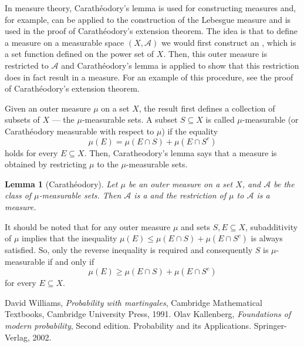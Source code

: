 \documentclass[12pt]{article}
\newtheorem*{lemma}{Lemma}
\begin{document}
In measure theory, Carath\'eodory's lemma is used for constructing measures and, for example, can be applied to the construction of the Lebesgue measure and is used in the proof of Carath\'eodory's extension theorem.
The idea is that to define a measure on a measurable space $(X,\mathcal{A})$ we would first construct an , which is a set function defined on the power set of $X$. Then, this outer measure is restricted to $\mathcal{A}$ and Carath\'eodory's lemma is applied to show that this restriction does in fact result in a measure. For an example of this procedure, see the proof of Carath\'eodory's extension theorem.

Given an outer measure $\mu$ on a set $X$, the result first defines a collection of subsets of $X$ --- the $\mu$-measurable sets.
A subset $S\subseteq X$ is called $\mu$-measurable (or Carath\'eodory measurable with respect to $\mu$) if the equality
\begin{equation*}
\mu(E)=\mu(E\cap S)+\mu(E\cap S^c)
\end{equation*}
holds for every $E\subseteq X$. Then, Caratheodory's lemma says that a measure is obtained by restricting $\mu$ to the $\mu$-measurable sets.

\begin{lemma}[Carath\'eodory]
Let $\mu$ be an outer measure on a set $X$, and $\mathcal{A}$ be the class of $\mu$-measurable sets. Then $\mathcal{A}$ is a  and the restriction of $\mu$ to $\mathcal{A}$ is a measure.
\end{lemma}

It should be noted that for any outer measure $\mu$ and sets $S,E\subseteq X$, subadditivity of $\mu$ implies that the inequality $\mu(E)\le\mu(E\cap S)+\mu(E\cap S^c)$ is always satisfied. So, only the reverse inequality is required and consequently $S$ is $\mu$-measurable if and only if
\begin{equation*}
\mu(E)\ge\mu(E\cap S)+\mu(E\cap S^c)
\end{equation*}
for every $E\subseteq X$.

\begin{thebibliography}{9}
David Williams, \emph{Probability with martingales},
Cambridge Mathematical Textbooks, Cambridge University Press, 1991.
Olav Kallenberg, \emph{Foundations of modern probability}, Second edition. Probability and its Applications. Springer-Verlag, 2002.
\end{thebibliography}

\end{document}
